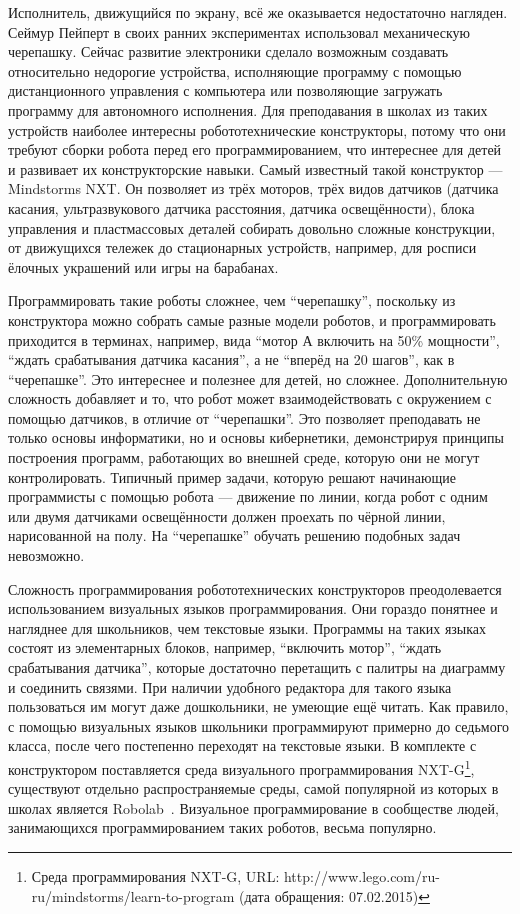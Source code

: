 Исполнитель, движущийся по экрану, всё же оказывается недостаточно нагляден. Сеймур Пейперт 
в своих ранних экспериментах использовал механическую черепашку. Сейчас развитие электроники 
сделало возможным создавать относительно недорогие устройства, исполняющие программу 
с помощью дистанционного управления с компьютера или позволяющие загружать программу 
для автономного исполнения. Для преподавания в школах из таких устройств наиболее 
интересны робототехнические конструкторы, потому что они требуют сборки робота перед 
его программированием, что интереснее для детей и развивает их конструкторские навыки. 
Самый известный такой конструктор --- Mindstorms NXT. Он позволяет из трёх моторов, 
трёх видов датчиков (датчика касания, ультразвукового датчика расстояния, датчика 
освещённости), блока управления и пластмассовых деталей собирать довольно сложные 
конструкции, от движущихся тележек до стационарных устройств, например, для росписи 
ёлочных украшений или игры на барабанах. 

Программировать такие роботы сложнее, чем "`черепашку"', поскольку из конструктора 
можно собрать самые разные модели роботов, и программировать приходится в терминах, 
например, вида "`мотор А включить на 50\% мощности"', "`ждать срабатывания датчика касания"', 
а не "`вперёд на 20 шагов"', как в "`черепашке"'. Это интереснее и полезнее для детей, 
но сложнее. Дополнительную сложность добавляет и то, что робот может взаимодействовать 
с окружением с помощью датчиков, в отличие от "`черепашки"'. Это позволяет преподавать 
не только основы информатики, но и основы кибернетики, демонстрируя принципы построения 
программ, работающих во внешней среде, которую они не могут контролировать. Типичный 
пример задачи, которую решают начинающие программисты с помощью робота --- движение по линии, 
когда робот с одним или двумя датчиками освещённости должен проехать по чёрной линии, 
нарисованной на полу. На "`черепашке"' обучать решению подобных задач невозможно.

Сложность программирования робототехнических конструкторов преодолевается использованием 
визуальных языков программирования. Они гораздо понятнее и нагляднее для школьников, 
чем текстовые языки. Программы на таких языках состоят из элементарных блоков, например, 
"`включить мотор"', "`ждать срабатывания датчика"', которые достаточно перетащить с 
палитры на диаграмму и соединить связями. При наличии удобного редактора для такого 
языка пользоваться им могут даже дошкольники, не умеющие ещё читать. Как правило, с 
помощью визуальных языков школьники программируют примерно до седьмого класса, после 
чего постепенно переходят на текстовые языки. В комплекте с конструктором поставляется среда визуального программирования 
NXT-G\footnote{Среда программирования NXT-G, URL: http://www.lego.com/ru-ru/mindstorms/learn-to-program (дата обращения: 07.02.2015)}, 
существуют отдельно распространяемые среды, самой популярной из которых в школах является Robolab~\cite{portsmore1999robolab}. 
Визуальное программирование в сообществе людей, занимающихся программированием таких роботов, весьма популярно.

